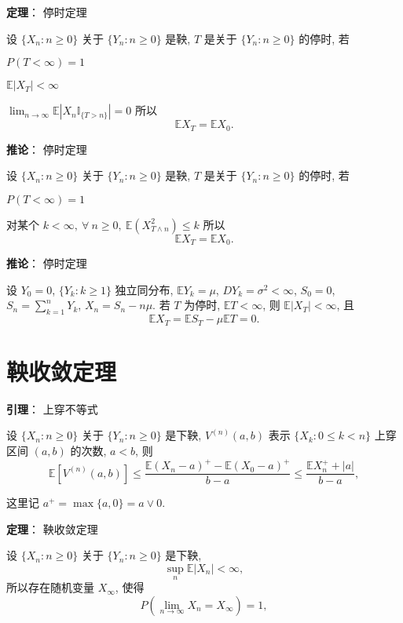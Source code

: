 \documentclass[openany]{ctexbook}
\theoremstyle{kaiti}
\theoremstyle{normal}
\begin{document}
\textbf{定理}： 停时定理

设 $\{X_n:n\geqslant0\}$ 关于 $\{Y_n:n\geqslant0\}$ 是鞅, $T$ 是关于 $\{Y_n:n\geqslant0\}$ 的停时, 若

$P(T<\infty)=1$

$\mathbb{E}|X_T|<\infty$

$\lim_{n\to\infty}\mathbb{E}|X_n\mathbb{I}_{\{T>n\}}|=0$
所以 
\begin{equation}
  \mathbb{E}X_T=\mathbb{E}X_0.
\end{equation}

\textbf{推论}： 停时定理

设 $\{X_n:n\geqslant0\}$ 关于 $\{Y_n:n\geqslant0\}$ 是鞅, $T$ 是关于 $\{Y_n:n\geqslant0\}$ 的停时, 若

$P(T<\infty)=1$

对某个 $k<\infty,~\forall~n\geqslant0,~\mathbb{E}(X_{T\wedge n}^2)\leqslant k$
所以 
\begin{equation}
  \mathbb{E}X_T=\mathbb{E}X_0.
\end{equation}

\textbf{推论}： 停时定理

设 $Y_0=0$, $\{Y_k:k\geqslant1\}$ 独立同分布, $\mathbb{E}Y_k=\mu$, $DY_k=\sigma^2<\infty$, $S_0=0$, $S_n=\sum_{k=1}^nY_k$, $X_n=S_n-n\mu$. 若 $T$ 为停时, $\mathbb{E}T<\infty$, 则 $\mathbb{E}|X_T|<\infty$, 且 
\begin{equation}
  \mathbb{E}X_T=\mathbb{E}S_T-\mu \mathbb{E}T=0.
\end{equation}

\section{鞅收敛定理}

\textbf{引理}： 上穿不等式

设 $\{X_n:n\geqslant0\}$ 关于 $\{Y_n:n\geqslant0\}$ 是下鞅, $V^{(n)}(a,b)$ 表示 $\{X_k:0\leqslant k< n\}$ 上穿区间 $(a,b)$ 的次数, $a< b$, 则
\begin{equation}
  \mathbb{E}[V^{(n)}(a,b)]\leqslant\frac{\mathbb{E}(X_n-a)^+-\mathbb{E}(X_0-a)^+}{b-a}\leqslant\frac{\mathbb{E}X_n^++|a|}{b-a},
\end{equation}

这里记 $a^+=\max\{a,0\}=a\vee0$.

\textbf{定理}： 鞅收敛定理

设 $\{X_n:n\geqslant0\}$ 关于 $\{Y_n:n\geqslant0\}$ 是下鞅, 
\begin{equation}
  \sup_n\mathbb{E}|X_n|<\infty,
\end{equation}
所以存在随机变量 $X_\infty$, 使得
\begin{equation}
  P\left(\lim_{n\to\infty}X_n=X_\infty\right)=1,
\end{equation}
\end{document}
